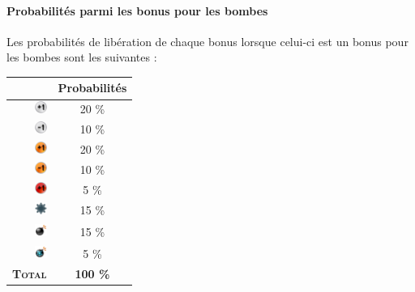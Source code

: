 \paragraph{Probabilités parmi les bonus pour les bombes}
Les probabilités de libération de chaque bonus lorsque celui-ci est un bonus pour les bombes sont les suivantes :\begin{center}
\begin{tabular}{|r|c|}
\hline 
& Probabilités \\ 
\hline 
\includegraphics[width=15px,height=15px]{images/bombMore.png} & 20 \% \\ 
\hline 
\includegraphics[width=15px,height=15px]{images/bombLess.png} & 10 \% \\ 
\hline 
\includegraphics[width=15px,height=15px]{images/rangeMore.png} & 20 \% \\ 
\hline 
\includegraphics[width=15px,height=15px]{images/rangeLess.png} & 10 \% \\ 
\hline 
\includegraphics[width=15px,height=15px]{images/rangeMax.png} & 5 \% \\ 
\hline 
\includegraphics[width=15px,height=15px]{images/mine.png} & 15 \% \\ 
\hline 
\includegraphics[width=15px,height=20px]{images/bomb.png} & 15 \% \\ 
\hline 
\includegraphics[width=15px,height=15px]{images/atomicBomb.png} & 5 \% \\ 
\hline 
\textbf{\textsc{Total}} & \textbf{100 \%} \\ 
\hline 
\end{tabular} 
\end{center}

